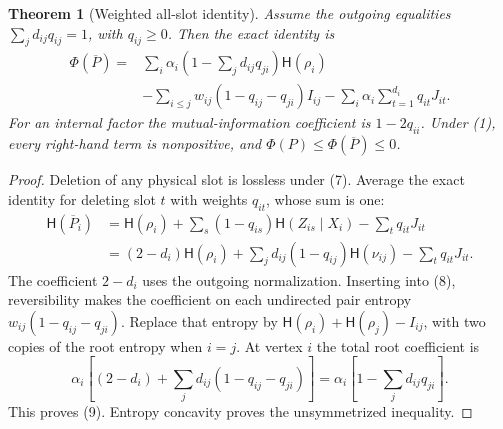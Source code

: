 \documentclass[11pt]{article}
\newtheorem{theorem}{Theorem}
\newcommand{\HH}{\mathsf H}
\begin{document}
\begin{theorem}[Weighted all-slot identity]\label{thm:entropy}
Assume the outgoing equalities $\sum_jd_{ij}q_{ij}=1$, with
$q_{ij}\geq0$. Then the exact identity is
\begin{align}
 \Phi(\overline P)
 ={}&\sum_i\alpha_i\left(1-\sum_jd_{ij}q_{ji}\right)\HH(\rho_i)
 \nonumber\\
 &-\sum_{i\leq j}w_{ij}(1-q_{ij}-q_{ji})I_{ij}
 -\sum_i\alpha_i\sum_{t=1}^{d_i}q_{it}J_{it}.       \tag{9}
\end{align}
For an internal factor the mutual-information coefficient is
$1-2q_{ii}$. Under (1), every right-hand term is nonpositive, and
$\Phi(P)\leq\Phi(\overline P)\leq0$.
\end{theorem}
\begin{proof}
Deletion of any physical slot is lossless under (7). Average the exact
identity for deleting slot $t$ with weights $q_{it}$, whose sum is one:
\begin{align*}
 \HH(\overline P_i)
 &=\HH(\rho_i)+\sum_s(1-q_{is})\HH(Z_{is}\mid X_i)
                         -\sum_tq_{it}J_{it}\\
 &=(2-d_i)\HH(\rho_i)
       +\sum_jd_{ij}(1-q_{ij})\HH(\nu_{ij})-\sum_tq_{it}J_{it}.
\end{align*}
The coefficient $2-d_i$ uses the outgoing normalization.
Inserting into (8), reversibility makes the coefficient on each
undirected pair entropy $w_{ij}(1-q_{ij}-q_{ji})$.
Replace that entropy by
$\HH(\rho_i)+\HH(\rho_j)-I_{ij}$, with two copies of the
root entropy when $i=j$. At vertex $i$ the total root coefficient is
\[
 \alpha_i\left[(2-d_i)+\sum_jd_{ij}(1-q_{ij}-q_{ji})\right]
 =\alpha_i\left[1-\sum_jd_{ij}q_{ji}\right].
\]
This proves (9). Entropy concavity proves the unsymmetrized inequality.
\end{proof}
\end{document}
